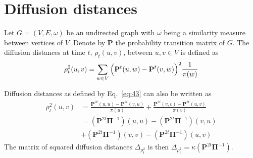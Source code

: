 \section{Diffusion distances}
\label{sec:diffusion-distances}
Let $G = (V,E,\omega)$ be an undirected graph with
$\omega$ being a similarity measure between vertices of $V$. Denote by
$\mathbf{P}$ the probability transition matrix of $G$. The diffusion
distances at time $t$, $\rho_{t}(u,v)$, between $u,v \in V$ is defined as
\citep{coifman06:_diffus_maps}
\begin{equation}
  \label{eq:43}
  \rho^{2}_{t}(u,v) = \sum_{w \in V}{\Bigl(\mathbf{P}^{t}(u,w) -
      \mathbf{P}^{t}(v,w)\Bigr)^2 \frac{1}{\pi(w)}}
\end{equation}
\begin{proposition}
  \label{prop:12}
  Diffusion distances as defined by Eq.~\eqref{eq:43} can also be
  written as
  \begin{equation}
    \label{eq:44}
    \begin{split}
      \rho_{t}^{2}(u,v) &= \frac{\mathbf{P}^{2t}(u,u) -
        \mathbf{P}^{2t}(v,u)}{\pi(u)} +
      \frac{\mathbf{P}^{2t}(v,v) -
        \mathbf{P}^{2t}(u,v)}{\pi(v)}  \\
      &= (\mathbf{P}^{2t}\bm{\Pi}^{-1})(u,u) -
      (\mathbf{P}^{2t}\bm{\Pi}^{-1})(v,u) \\
      &+ (\mathbf{P}^{2t}\bm{\Pi}^{-1})(v,v) -
      (\mathbf{P}^{2t}\bm{\Pi}^{-1})(u,v)
    \end{split}
  \end{equation}
The matrix of squared diffusion distances $\Delta_{\rho_t^2}$ is then
$\Delta_{\rho_t^2} = \kappa(\mathbf{P}^{2t}\bm{\Pi}^{-1})$. 
\end{proposition}
